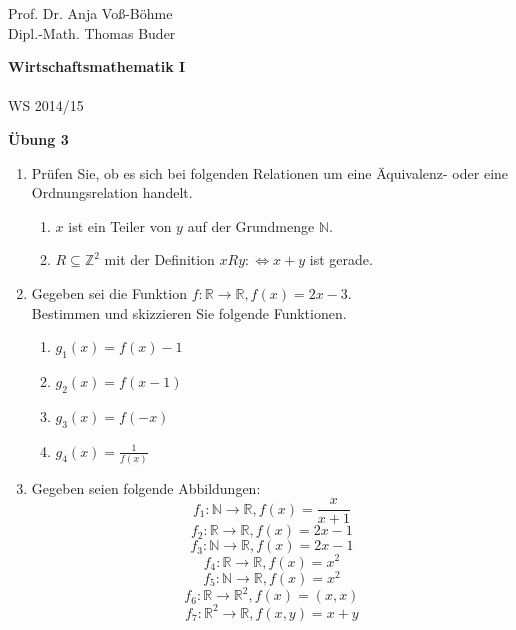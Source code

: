 \documentclass[12pt,a4paper]{scrreprt}
\newcommand{\N}{\mathds{N}}
\newcommand{\Z}{\mathds{Z}}
\newcommand{\R}{\mathds{R}}
\begin{document}
 
\begin{flushleft}
Prof. Dr.  Anja Voß-Böhme \\
Dipl.-Math. Thomas Buder
\end{flushleft}

\begin{center}{\large\bf Wirtschaftsmathematik I} \\ \\ WS 2014/15 \end{center}

\begin{center}{\large\bf Übung 3 } 
\end{center}


\bigskip
\begin{enumerate}
 			
\item Prüfen Sie, ob es sich bei folgenden Relationen um eine Äquivalenz- oder eine Ordnungsrelation handelt.

		\begin{enumerate}
			\item $x$ ist ein Teiler von $y$ auf der Grundmenge $\N$.
			\item $ R\subseteq \Z^2$ mit der Definition $x R y:\Leftrightarrow x+y$ ist gerade.
		\end{enumerate}
		
		
\item Gegeben sei die Funktion $f: \R \to \R, f(x)=2x-3.$ \\
			Bestimmen und skizzieren Sie folgende Funktionen.
 \begin{enumerate}
			\item $g_1(x)=f(x)-1$
			\item $g_2(x)=f(x-1)$
			\item $g_3(x)=f(-x)$
			\item $g_4(x)=\frac{1}{f(x)}$
 \end{enumerate}

 \item Gegeben seien folgende Abbildungen: \\
\[f_1: \N \to \R,   f(x)=\frac{x}{x+1}\]
\[f_2: \R \to \R,   f(x)=2x-1\]
\[f_3: \N \to \R,   f(x)=2x-1\]
\[f_4: \R \to \R,   f(x)=x^2\]
\[f_5: \N \to \R,   f(x)=x^2\]
\[f_6: \R \to \R^2, f(x)=(x,x) \]
\[f_7: \R^2 \to \R, f(x,y) = x+y \] 


\end{enumerate}
\end{document}
